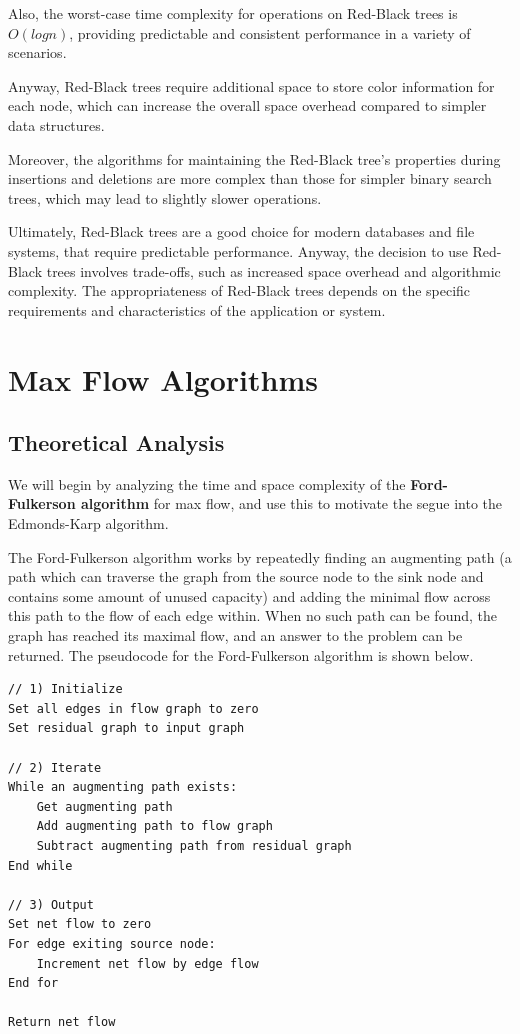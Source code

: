\documentclass[12pt]{amsart}
\begin{document}
    Also, the worst-case time complexity for operations on
    Red-Black trees is $O(log n)$, providing predictable and
    consistent performance in a variety of scenarios.
    
    Anyway, Red-Black trees require additional space to store
    color information for each node, which can increase the
    overall space overhead compared to simpler data structures.
    
    Moreover, the algorithms for maintaining the Red-Black
    tree's properties during insertions and deletions are more
    complex than those for simpler binary search trees, which
    may lead to slightly slower operations.
    
    Ultimately, Red-Black trees are a good choice for modern
    databases and file systems, that require predictable
    performance. Anyway, the decision to use Red-Black trees
    involves trade-offs, such as increased space overhead and
    algorithmic complexity. The appropriateness of Red-Black
    trees depends on the specific requirements and
    characteristics of the application or system.
    
\section{Max Flow Algorithms}

\subsection{Theoretical Analysis}

    We will begin by analyzing the time and space complexity
    of the \textbf{Ford-Fulkerson algorithm} for max flow, and
    use this to motivate the segue into the Edmonds-Karp
    algorithm.

    The Ford-Fulkerson algorithm works by repeatedly finding an
    augmenting path (a path which can traverse the graph from
    the source node to the sink node and contains some amount of
    unused capacity) and adding the minimal flow across this
    path to the flow of each edge within. When no such path can
    be found, the graph has reached its maximal flow, and an
    answer to the problem can be returned. The pseudocode for
    the Ford-Fulkerson algorithm is shown below.

\begin{verbatim}
// 1) Initialize
Set all edges in flow graph to zero
Set residual graph to input graph

// 2) Iterate
While an augmenting path exists:
    Get augmenting path
    Add augmenting path to flow graph
    Subtract augmenting path from residual graph
End while

// 3) Output
Set net flow to zero
For edge exiting source node:
    Increment net flow by edge flow
End for

Return net flow
\end{verbatim}
\end{document}
